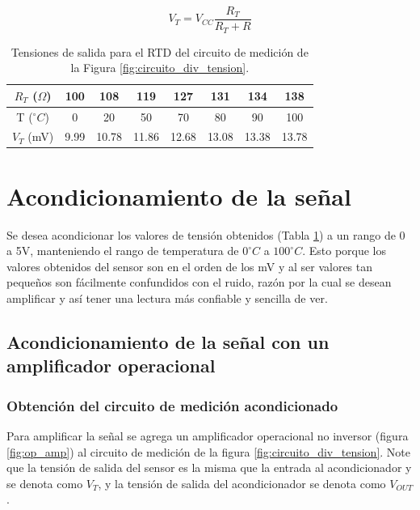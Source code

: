 \documentclass[journal,trans]{IEEEtran}
\begin{document}
\begin{equation} \label{eq:div_tension}
    V_{T} = V_{CC}\frac{R_{T}}{R_{T}+R}
\end{equation}

\begin{table}[htb]
    \begin{center}
        \caption{Tensiones de salida para el RTD del circuito de medición de la Figura \ref{fig:circuito_div_tension}.}
        \label{tab:tensiones_salida}
        \begin{tabular}{c | c | c | c | c | c | c | c}
            \hline
            $R_{T}$ ($\Omega$) & 100 & 108 & 119 & 127 & 131 & 134 & 138 \\
            \hline
            T ($^{\circ}C$) & 0 & 20 & 50 & 70 & 80 & 90 & 100  \\
            \hline
            $V_{T}$ (mV) & 9.99 & 10.78 & 11.86 & 12.68 & 13.08 & 13.38 & 13.78  \\
            \hline
        \end{tabular}
    \end{center}
\end{table}


\section{Acondicionamiento de la señal }
Se desea acondicionar los valores de tensión obtenidos (Tabla \ref{tab:tensiones_salida}) a un rango de 0 a 5V, manteniendo el rango de temperatura de $0^{\circ}C$ a $100^{\circ}C$. Esto porque los valores obtenidos del sensor son en el orden de los mV y al ser valores tan pequeños son fácilmente confundidos con el ruido, razón por la cual se desean amplificar y así tener una lectura más confiable y sencilla de ver.

\subsection{Acondicionamiento de la señal con un amplificador operacional}
\subsubsection{Obtención del circuito de medición acondicionado}

Para amplificar la señal se agrega un amplificador operacional no inversor (figura \ref{fig:op_amp}) al circuito de medición de la figura \ref{fig:circuito_div_tension}. Note que la tensión de salida del sensor es la misma que la entrada al acondicionador y se denota como $V_{T}$, y la tensión de salida del acondicionador se denota como $V_{OUT}$.
\end{document}
